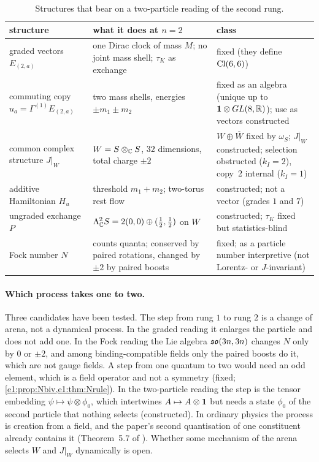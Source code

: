 \begin{table}[t]
\centering
\footnotesize
\begin{tabular}{@{}>{\raggedright\arraybackslash}p{3.6cm}>{\raggedright\arraybackslash}p{6.4cm}>{\raggedright\arraybackslash}p{4.6cm}@{}}
\toprule
structure & what it does at $n=2$ & class\\
\midrule
graded vectors $E_{(2,a)}$ & one Dirac clock of mass $M$; no joint mass shell; $\tau_K$ as exchange & fixed (they define $\mathrm{Cl}(6,6)$)\\
commuting copy $u_a=\Gamma^{(1)}E_{(2,a)}$ & two mass shells, energies $\pm m_1\pm m_2$ & fixed as an algebra (unique up to $\mathbf 1\otimes GL(8,\mathbb{R})$); use as vectors constructed\\
common complex structure $J|_W$ & $W=S\otimes_{\mathbb{C}} S$, $32$ dimensions, total charge $\pm2$ & $W\oplus\overline W$ fixed by $\omega_S$; $J|_W$ constructed; selection obstructed ($k_I=2$), copy~2 internal ($k_I=1$)\\
additive Hamiltonian $H_u$ & threshold $m_1+m_2$; two-torus rest flow & constructed; not a vector (grades $1$ and $7$)\\
ungraded exchange $P$ & $\Lambda^2_{\mathbb{C}} S=2(0,0)\oplus(\tfrac12,\tfrac12)$ on $W$ & constructed; $\tau_K$ fixed but statistics-blind\\
Fock number $N$ & counts quanta; conserved by paired rotations, changed by $\pm2$ by paired boosts & fixed; as a particle number interpretive (not Lorentz- or $J$-invariant)\\
\bottomrule
\end{tabular}
\caption{Structures that bear on a two-particle reading of the second rung.}
\label{e1:tab:answer}
\end{table}

\paragraph{Which process takes one to two.} Three candidates have been tested. The step from rung $1$ to rung $2$ is a change of arena,
not a dynamical process. In the graded reading it enlarges the particle and does not add one. In the Fock reading the Lie algebra
$\mathfrak{so}(3n,3n)$ changes $N$ only by $0$ or $\pm2$, and among binding-compatible fields only the paired boosts do it, which are not gauge fields.
A step from one quantum to two would need an odd element, which is a field operator and not a symmetry (fixed;
\cref{e1:prop:Nbiv,e1:thm:Nrule}). In the two-particle reading the step is the tensor embedding $\psi\mapsto\psi\otimes\phi_0$, which intertwines
$A\mapsto A\otimes\mathbf 1$ but needs a state $\phi_0$ of the second particle that nothing selects (constructed). In ordinary physics
the process is creation from a field, and the paper's second quantisation of one constituent already contains it (Theorem~5.7 of
\cite{ES17}). Whether some mechanism of the arena selects $W$ and $J|_W$ dynamically is open.

